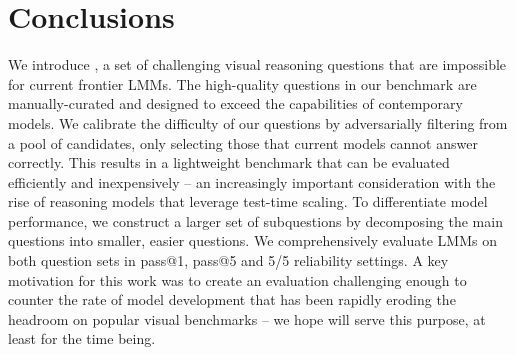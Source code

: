 \section{Conclusions}
\label{sec:conclusion}

We introduce \benchmarkName, a set of \nquestions challenging visual reasoning questions that are impossible for current frontier LMMs. The high-quality questions in our benchmark are manually-curated and designed to exceed the capabilities of contemporary models. We calibrate the difficulty of our questions by adversarially filtering from a pool of candidates, only selecting those that current models cannot answer correctly. This results in a lightweight benchmark that can be evaluated efficiently and inexpensively -- an increasingly important consideration with the rise of reasoning models that leverage test-time scaling. To differentiate model performance, we construct a larger set of \nsubquestions subquestions by decomposing the main questions into smaller, easier questions. We comprehensively evaluate \nmodelsevaluated  LMMs on both question sets in pass@1, pass@5 and 5/5 reliability settings. A key motivation for this work was to create an evaluation challenging enough to counter the rate of model development that has been rapidly eroding the headroom on popular visual benchmarks -- we hope \benchmarkName will serve this purpose, at least for the time being.

